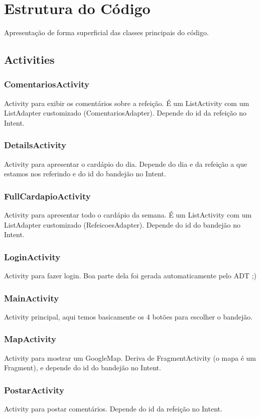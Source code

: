 \section{Estrutura do Código}
Apresentação de forma superficial das classes principais do código.
\subsection{Activities}
\subsubsection{ComentariosActivity}
Activity para exibir os comentários sobre a refeição. É um ListActivity com um ListAdapter customizado (ComentariosAdapter). Depende do id da refeição no Intent.

\subsubsection{DetailsActivity}
Activity para apresentar o cardápio do dia. Depende do dia e da refeição a que estamos nos referindo e do id do bandejão no Intent.

\subsubsection{FullCardapioActivity}
Activity para apresentar todo o cardápio da semana. É um ListActivity com um ListAdapter customizado (RefeicoesAdapter).
Depende do id do bandejão no Intent.

\subsubsection{LoginActivity}
Activity para fazer login. Boa parte dela foi gerada automaticamente pelo ADT ;)

\subsubsection{MainActivity}
Activity principal, aqui temos basicamente os 4 botões para escolher o bandejão.

\subsubsection{MapActivity}
Activity para mostrar um GoogleMap. Deriva de FragmentActivity (o mapa é um Fragment), e depende do id do bandejão no Intent.

\subsubsection{PostarActivity}
Activity para postar comentários. Depende do id da refeição no Intent.


